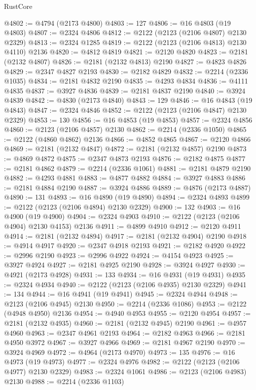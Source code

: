 \begin{lexlean}{RustCore}
\begin{coremodule}
@4802 := @4794 (@2173 @4800)
@4803 := 127
@4806 := @16 @4803 (@19 @4803)
@4807 := @2324 @4806
@4812 := @2122 (@2123 (@2106 @4807) @2130 @2329)
@4813 := @2324 @1285
@4819 := @2122 (@2123 (@2106 @4813) @2130 @4110) @2136
@4820 := @4812 @4819
@4821 := @2120 @4820
@4823 := @2181 (@2132 @4807)
@4826 := @2181 (@2132 @4813) @2190
@4827 := @4823 @4826
@4829 := @2347 @4827 @2193
@4830 := @2182 @4829
@4832 := @2214 (@2336 @1035)
@4834 := @2181 @4832 @2190
@4835 := @4293 @4834
@4836 := @4111 @4835
@4837 := @3927 @4836
@4839 := @2181 @4837 @2190
@4840 := @3924 @4839
@4842 := @4830 (@2173 @4840)
@4843 := 129
@4846 := @16 @4843 (@19 @4843)
@4847 := @2324 @4846
@4852 := @2122 (@2123 (@2106 @4847) @2130 @2329)
@4853 := 130
@4856 := @16 @4853 (@19 @4853)
@4857 := @2324 @4856
@4860 := @2123 (@2106 @4857) @2130
@4862 := @2214 (@2336 @1050)
@4865 := @2122 (@4860 @4862) @2136
@4866 := @4852 @4865
@4867 := @2120 @4866
@4869 := @2181 (@2132 @4847)
@4872 := @2181 (@2132 @4857) @2190
@4873 := @4869 @4872
@4875 := @2347 @4873 @2193
@4876 := @2182 @4875
@4877 := @2181 @4862
@4879 := @2214 (@2336 @1061)
@4881 := @2181 @4879 @2190
@4882 := @4293 @4881
@4883 := @4877 @4882
@4884 := @3927 @4883
@4886 := @2181 @4884 @2190
@4887 := @3924 @4886
@4889 := @4876 (@2173 @4887)
@4890 := 131
@4893 := @16 @4890 (@19 @4890)
@4894 := @2324 @4893
@4899 := @2122 (@2123 (@2106 @4894) @2130 @2329)
@4900 := 132
@4903 := @16 @4900 (@19 @4900)
@4904 := @2324 @4903
@4910 := @2122 (@2123 (@2106 @4904) @2130 @4153) @2136
@4911 := @4899 @4910
@4912 := @2120 @4911
@4914 := @2181 (@2132 @4894)
@4917 := @2181 (@2132 @4904) @2190
@4918 := @4914 @4917
@4920 := @2347 @4918 @2193
@4921 := @2182 @4920
@4922 := @2996 @2190
@4923 := @2996 @4922
@4924 := @4154 @4923
@4925 := @3927 @4924
@4927 := @2181 @4925 @2190
@4928 := @3924 @4927
@4930 := @4921 (@2173 @4928)
@4931 := 133
@4934 := @16 @4931 (@19 @4931)
@4935 := @2324 @4934
@4940 := @2122 (@2123 (@2106 @4935) @2130 @2329)
@4941 := 134
@4944 := @16 @4941 (@19 @4941)
@4945 := @2324 @4944
@4948 := @2123 (@2106 @4945) @2130
@4950 := @2214 (@2336 @1086)
@4953 := @2122 (@4948 @4950) @2136
@4954 := @4940 @4953
@4955 := @2120 @4954
@4957 := @2181 (@2132 @4935)
@4960 := @2181 (@2132 @4945) @2190
@4961 := @4957 @4960
@4963 := @2347 @4961 @2193
@4964 := @2182 @4963
@4966 := @2181 @4950 @3972
@4967 := @3927 @4966
@4969 := @2181 @4967 @2190
@4970 := @3924 @4969
@4972 := @4964 (@2173 @4970)
@4973 := 135
@4976 := @16 @4973 (@19 @4973)
@4977 := @2324 @4976
@4982 := @2122 (@2123 (@2106 @4977) @2130 @2329)
@4983 := @2324 @1061
@4986 := @2123 (@2106 @4983) @2130
@4988 := @2214 (@2336 @1103)

\end{coremodule}
\end{lexlean}

